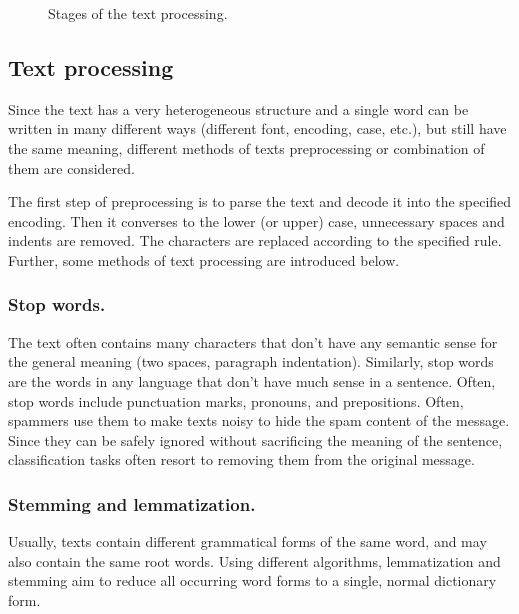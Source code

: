 \documentclass[a4paper]{jpconf}
\begin{document}
\begin{figure}[h!]
\centering
{}
\caption{\label{fig:00}Stages of the text processing.}
\end{figure}

\subsection{Text processing}
Since the text has a very heterogeneous structure and a single word can be written in many different ways (different font, encoding, case, etc.), but still have the same meaning, different methods of texts preprocessing or combination of them are considered.

The first step of preprocessing is to parse the text and decode it into the specified encoding. Then it converses to the lower (or upper) case, unnecessary spaces and indents are removed. The characters are replaced according to the specified rule. Further, some methods of text processing are introduced below.

\subsubsection*{Stop words.}
The text often contains many characters that don't have any semantic sense for the general meaning (two spaces, paragraph indentation).
Similarly, stop words are the words in any language that don't have much sense in a sentence. Often, stop words include punctuation marks, pronouns, and prepositions. Often, spammers use them to make texts noisy to hide the spam content of the message. Since they can be safely ignored without sacrificing the meaning of the sentence, classification tasks often resort to removing them from the original message.

\subsubsection*{Stemming and lemmatization.}
Usually, texts contain different grammatical forms of the same word, and may also contain the same root words. Using different algorithms, lemmatization and stemming aim to reduce all occurring word forms to a single, normal dictionary form.
\end{document}
